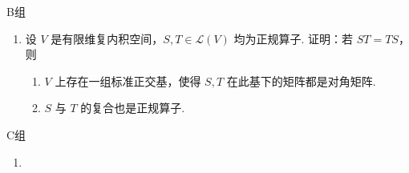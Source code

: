 \centerline{\heiti B组}
\begin{enumerate}
    \item 设 $ V $ 是有限维复内积空间，$ S, T \in \mathcal{L}(V) $ 均为正规算子. 证明：若 $ ST = TS $，则
          \begin{enumerate}
              \item $ V $ 上存在一组标准正交基，使得 $ S, T $ 在此基下的矩阵都是对角矩阵.

              \item $ S $ 与 $ T $ 的复合也是正规算子.
          \end{enumerate}
\end{enumerate}

\centerline{\heiti C组}
\begin{enumerate}
    \item
\end{enumerate}
